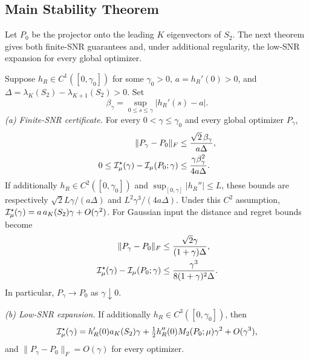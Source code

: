 \subsection{Main Stability Theorem}
Let $P_0$ be the projector onto the leading $K$ eigenvectors of $S_2$. The next theorem gives both finite-SNR guarantees and, under additional regularity, the low-SNR expansion for every global optimizer.

\begin{theorem}\label{thm:stability}
Suppose $h_R\in C^1([0,\gamma_0])$ for some $\gamma_0>0$, $a=h_R'(0)>0$, and $\Delta=\lambda_K(S_2)-\lambda_{K+1}(S_2)>0$. Set
\begin{equation}
\beta_\gamma=\sup_{0\le s\le\gamma}|h_R'(s)-a|.
\end{equation}
\emph{(a) Finite-SNR certificate.} For every $0<\gamma\le\gamma_0$ and every global optimizer $P_\gamma$,
\begin{align}
\|P_\gamma-P_0\|_F&\le\frac{\sqrt2\,\beta_\gamma}{a\Delta},\label{eq:explicit_distance}\\
0\le\mathcal I_\mu^\star(\gamma)-\mathcal I_\mu(P_0;\gamma)
&\le\frac{\gamma\beta_\gamma^2}{4a\Delta}.\label{eq:explicit_regret}
\end{align}
If additionally $h_R\in C^2([0,\gamma_0])$ and $\sup_{[0,\gamma]}|h_R''|\le L$, these bounds are respectively $\sqrt2 L\gamma/(a\Delta)$ and $L^2\gamma^3/(4a\Delta)$. Under this $C^2$ assumption, $\mathcal I_\mu^\star(\gamma)=a\,a_K(S_2)\gamma+O(\gamma^2)$. For Gaussian input the distance and regret bounds become
\begin{align}
\|P_\gamma-P_0\|_F&\le\frac{\sqrt2\gamma}{(1+\gamma)\Delta},\\
\mathcal I_\mu^\star(\gamma)-\mathcal I_\mu(P_0;\gamma)&\le\frac{\gamma^3}{8(1+\gamma)^2\Delta}.
\label{eq:gauss_regret}
\end{align}
In particular, $P_\gamma\to P_0$ as $\gamma\downarrow0$.

\emph{(b) Low-SNR expansion.} If additionally $h_R\in C^3([0,\gamma_0])$, then
\begin{equation}
\mathcal I_\mu^\star(\gamma)=h_R'(0)a_K(S_2)\gamma
+\tfrac12h_R''(0)M_2(P_0;\mu)\gamma^2+O(\gamma^3),
\label{eq:second_opt}
\end{equation}
and $\|P_\gamma-P_0\|_F=O(\gamma)$ for every optimizer.
\end{theorem}
